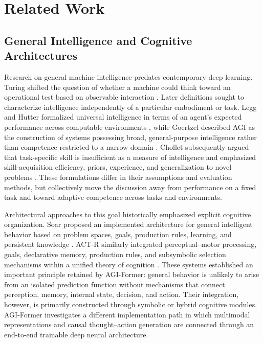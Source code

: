 \section{\textbf{Related Work}}

\subsection{\textbf{General Intelligence and Cognitive Architectures}}

Research on general machine intelligence predates contemporary deep learning. Turing shifted the question of whether a machine could think toward an operational test based on observable interaction \cite{turing1950computing}. Later definitions sought to characterize intelligence independently of a particular embodiment or task. Legg and Hutter formalized universal intelligence in terms of an agent's expected performance across computable environments \cite{legg2007universal}, while Goertzel described AGI as the construction of systems possessing broad, general-purpose intelligence rather than competence restricted to a narrow domain \cite{goertzel2014agi}. Chollet subsequently argued that task-specific skill is insufficient as a measure of intelligence and emphasized skill-acquisition efficiency, priors, experience, and generalization to novel problems \cite{chollet2019measure}. These formulations differ in their assumptions and evaluation methods, but collectively move the discussion away from performance on a fixed task and toward adaptive competence across tasks and environments.

Architectural approaches to this goal historically emphasized explicit cognitive organization. Soar proposed an implemented architecture for general intelligent behavior based on problem spaces, goals, production rules, learning, and persistent knowledge \cite{laird1987soar}. ACT-R similarly integrated perceptual--motor processing, goals, declarative memory, production rules, and subsymbolic selection mechanisms within a unified theory of cognition \cite{anderson2004integrated}. These systems established an important principle retained by AGI-Former: general behavior is unlikely to arise from an isolated prediction function without mechanisms that connect perception, memory, internal state, decision, and action. Their integration, however, is primarily constructed through symbolic or hybrid cognitive modules. AGI-Former investigates a different implementation path in which multimodal representations and causal thought--action generation are connected through an end-to-end trainable deep neural architecture.

